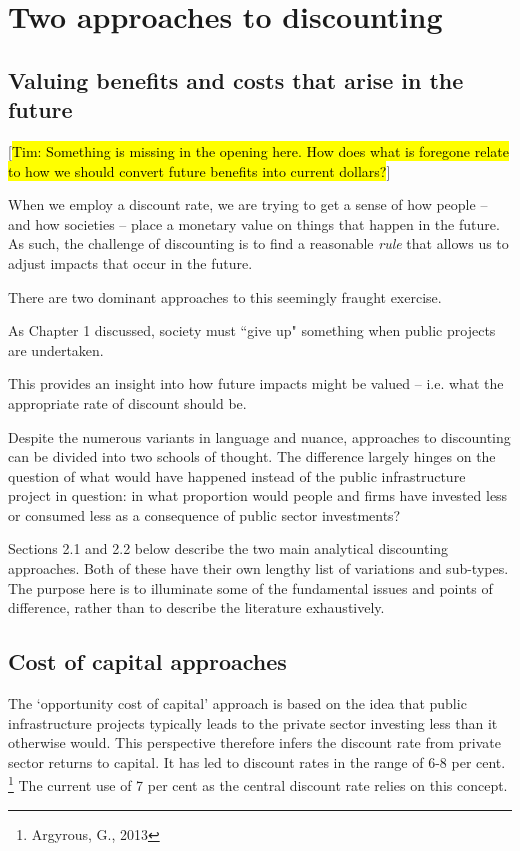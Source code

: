 \chapter{Two approaches to discounting}\label{chap:two-approaches to discounting}

\section{Valuing benefits and costs that arise in the future}

[\hl{Tim: Something is missing in the opening here. How does what is foregone relate to how we should convert future benefits into current dollars?}]

When we employ a discount rate, we are trying to get a sense of how people -- and how societies -- place a monetary value on things that happen in the future. As such, the challenge of discounting is to find a reasonable \emph{rule} that allows us to adjust impacts that occur in the future. 

There are two dominant approaches to this seemingly fraught exercise.   

As Chapter 1 discussed, society must ``give up" something when public projects are undertaken. 

This provides an insight into how future impacts might be valued -- i.e. what the appropriate rate of discount should be.  

Despite the numerous variants in language and nuance, approaches to discounting can be divided into two schools of thought. The difference largely hinges on the question of what would have happened instead of the public infrastructure project in question: in what proportion would people and firms have invested less or consumed less as a consequence of public sector investments? 

Sections 2.1 and 2.2 below describe the two main analytical discounting approaches. Both of these have their own lengthy list of variations and sub-types. The purpose here is to illuminate some of the fundamental issues and points of difference, rather than to describe the literature exhaustively. 

\section{Cost of capital approaches}
The ‘opportunity cost of capital’ approach is based on the idea that public infrastructure projects typically leads to the private sector investing less than it otherwise would. This perspective therefore infers the discount rate from private sector returns to capital. It has led to discount rates in the range of 6-8 per cent.%
    \footnote{Argyrous, G., 2013}
The current use of 7 per cent as the central discount rate relies on this concept. 

